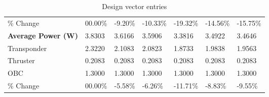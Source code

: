 \begin{table}[H]
\begin{tabular}{lllllll}
\% Change & 00.00\% &-9.20\% & -10.33\% & -19.32\% & -14.56\% & -15.75\% \\
\rowcolor[HTML]{EFEFEF} 
\cellcolor[HTML]{EFEFEF}\textbf{Average Power (W)} & \cellcolor[HTML]{EFEFEF}3.8303 & 3.6166 & 3.5906 & 3.3816 & 3.4922 & 3.4646 \\
Transponder & 2.3220 & 2.1083 & 2.0823 & 1.8733 & 1.9838 & 1.9563 \\
Thruster & 0.2083 & 0.2083 & 0.2083 & 0.2083 & 0.2083 & 0.2083 \\
OBC & 1.3000 & 1.3000 & 1.3000 & 1.3000 & 1.3000 & 1.3000 \\
\% Change & 00.00\% &-5.58\% & -6.26\% & -11.71\% & -8.83\% & -9.55\% \\
\end{tabular}
\caption{Design vector entries}
\label{tab:DesignVectorEntries_default56dur1len3int}
\end{table}